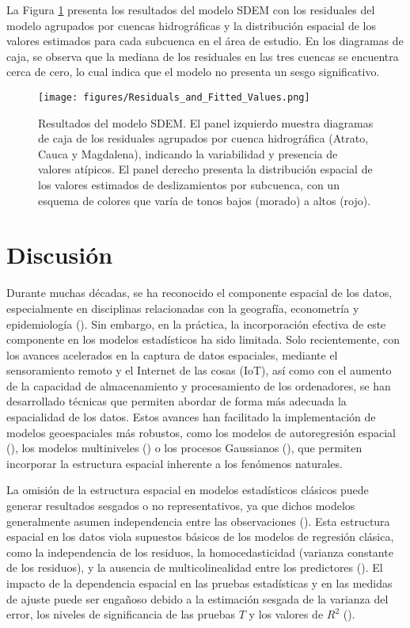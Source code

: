 \documentclass[
  manuscript=article,  
  layout=preprint,  
  year=2023,
  volume=0,
]{format}
\begin{document}
La Figura \ref{fig:residuals_fitted} presenta los resultados del modelo SDEM con los residuales del modelo agrupados por cuencas hidrográficas y la distribución espacial de los valores estimados para cada subcuenca en el área de estudio. En los diagramas de caja, se observa que la mediana de los residuales en las tres cuencas se encuentra cerca de cero, lo cual indica que el modelo no presenta un sesgo significativo. 

\begin{figure}[ht!]
    \centering
      {\texttt{[image: figures/Residuals\_and\_Fitted\_Values.png]}}
\caption{Resultados del modelo SDEM. El panel izquierdo muestra diagramas de caja de los residuales agrupados por cuenca hidrográfica (Atrato, Cauca y Magdalena), indicando la variabilidad y presencia de valores atípicos. El panel derecho presenta la distribución espacial de los valores estimados de deslizamientos por subcuenca, con un esquema de colores que varía de tonos bajos (morado) a altos (rojo).}
    \label{fig:residuals_fitted}
\end{figure}

\section{Discusión}

Durante muchas décadas, se ha reconocido el componente espacial de los datos, especialmente en disciplinas relacionadas con la geografía, econometría y epidemiología (\cite{anselin2022spatial, rey2023geographic}). Sin embargo, en la práctica, la incorporación efectiva de este componente en los modelos estadísticos ha sido limitada. Solo recientemente, con los avances acelerados en la captura de datos espaciales, mediante el sensoramiento remoto y el Internet de las cosas (IoT), así como con el aumento de la capacidad de almacenamiento y procesamiento de los ordenadores, se han desarrollado técnicas que permiten abordar de forma más adecuada la espacialidad de los datos. Estos avances han facilitado la implementación de modelos geoespaciales más robustos, como los modelos de autoregresión espacial (\cite{wall2004close}), los modelos multiniveles (\cite{lee1996hierarchical}) o los procesos Gaussianos (\cite{vasudevan2009gaussian}), que permiten incorporar la estructura espacial inherente a los fenómenos naturales.

La omisión de la estructura espacial en modelos estadísticos clásicos puede generar resultados sesgados o no representativos, ya que dichos modelos generalmente asumen independencia entre las observaciones (\cite{anselin1988spatial, lesage2011pitfalls}). Esta estructura espacial en los datos viola supuestos básicos de los modelos de regresión clásica, como la independencia de los residuos, la homocedasticidad (varianza constante de los residuos), y la ausencia de multicolinealidad entre los predictores (\cite{cressie1988spatial, ripley1988statistical, anselin1988spatial}). El impacto de la dependencia espacial en las pruebas estadísticas y en las medidas de ajuste puede ser engañoso debido a la estimación sesgada de la varianza del error, los niveles de significancia de las pruebas $T$ y los valores de $R^2$ (\cite{anselin1990spatial}).
\end{document}
